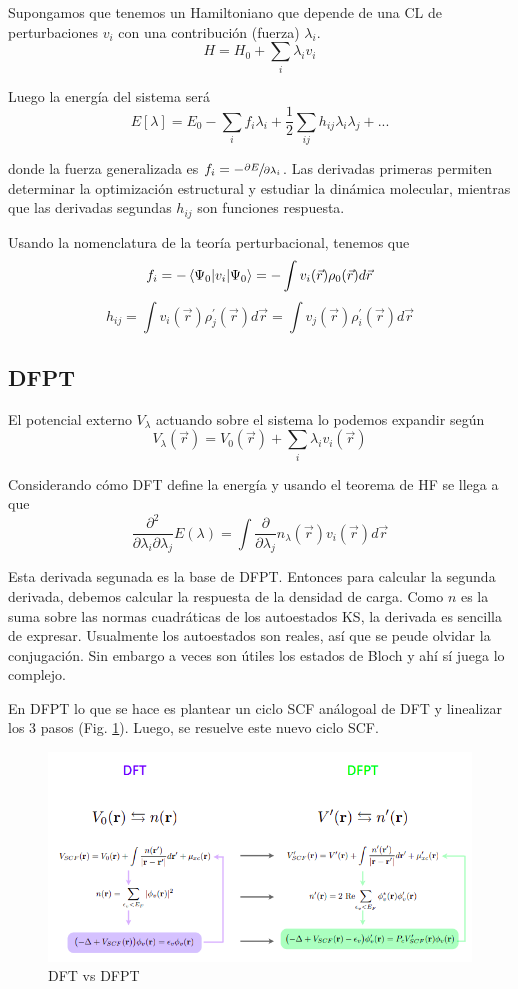   Supongamos que tenemos un Hamiltoniano que depende de una CL de perturbaciones $v_i$ con una contribución (fuerza) $\lambda_i$.
    $$H = H_0 + \sum_i \lambda_i v_i$$

  Luego la energía del sistema será
    $$E [\lambda] = E_0 - \sum_i f_i \lambda_i + \frac{1}{2} \sum_{ij} h_{ij} \lambda_i \lambda_j + ... $$

  donde la fuerza generalizada es $f_i = - \sfrac{\partial E}{\partial \lambda_i}$. Las derivadas primeras permiten determinar la optimización estructural y estudiar la dinámica molecular, mientras que las derivadas segundas $h_{ij}$ son funciones respuesta.

  Usando la nomenclatura de la teoría perturbacional, tenemos que
    $$f_i = - \expval{v_i}{\Psi_0} = - \int v_i (\vec{r}) \rho_0 (\vec{r}) d \vec{r}$$
    $$h_{ij} =  \int v_i (\vec{r}) \rho_j^{'} (\vec{r}) d \vec{r} = \int v_j (\vec{r}) \rho_i^{'} (\vec{r}) d \vec{r}$$

\subsection{DFPT}

  El potencial externo $V_{\lambda}$ actuando sobre el sistema lo podemos expandir según
    $$V_{\lambda} (\vec{r}) = V_0 (\vec{r}) + \sum_i \lambda_i v_i (\vec{r})$$

  Considerando cómo DFT define la energía y usando el teorema de HF se llega a que
    $$\frac{\partial^2}{\partial \lambda_i \partial \lambda_j} E (\lambda) = \int \frac{\partial}{\partial \lambda_j} n_{\lambda} (\vec{r}) v_i (\vec{r}) d \vec{r}$$

  Esta derivada segunada es la base de DFPT. Entonces para calcular la segunda derivada, debemos calcular la respuesta de la densidad de carga. Como $n$ es la suma sobre las normas cuadráticas de los autoestados KS, la derivada es sencilla de expresar. Usualmente los autoestados son reales, así que se peude olvidar la conjugación. Sin embargo a veces son útiles los estados de Bloch y ahí sí juega lo complejo.

  En DFPT lo que se hace es plantear un ciclo SCF análogoal de DFT y linealizar los 3 pasos (Fig. \ref{fig:DFPT}). Luego, se resuelve este nuevo ciclo SCF.

  \begin{figure}[H]
      \centering
      \includegraphics[scale = 0.6]{figs/D5/DFPT.png}
      \caption{DFT vs DFPT}
      \label{fig:DFPT}
  \end{figure}

